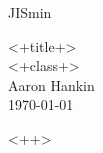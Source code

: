\documentclass[11pt]{scrartcl}
\begin{document}
\begin{CJK*}[dnp]{JIS}{min}

\begin{flushright} <+title+> \\ <+class+> \\ Aaron Hankin\\ \today 
\end{flushright}  	
\vspace{0.5cm}
<++>

  
\end{CJK*}
\end{document}
